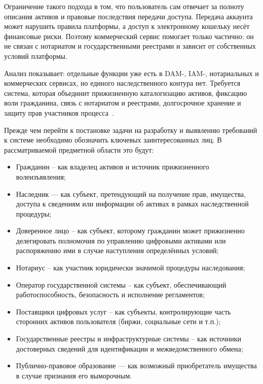 Ограничение такого подхода в том, что пользователь сам отвечает за полноту описания активов и правовые последствия передачи доступа. Передача аккаунта может нарушить правила платформы, а доступ к электронному кошельку несёт финансовые риски. Поэтому коммерческий сервис помогает только частично: он не связан с нотариатом и государственными реестрами и зависит от собственных условий платформы.

Анализ показывает: отдельные функции уже есть в DAM-, IAM-, нотариальных и коммерческих сервисах, но единого наследственного контура нет. Требуется система, которая объединит прижизненную каталогизацию активов, фиксацию воли гражданина, связь с нотариатом и реестрами, долгосрочное хранение и защиту прав участников процесса~\cite{Orlov2024Moluch, Haritonova2024HSE, Harbinja2022DigitalDeath}.

Прежде чем перейти к постановке задачи на разработку и выявлению требований к системе необходимо обозначить ключевых заинтересованных лиц. В рассматриваемой предметной области это будут:

\begin{itemize}
  \item Гражданин -- как владелец активов и источник прижизненного волеизъявления;
  \item Наследник --- как субъект, претендующий на получение прав, имущества, доступа к сведениям или информации об активах в рамках наследственной процедуры;
  \item Доверенное лицо -- как субъект, которому гражданин может прижизненно делегировать полномочия по управлению цифровыми активами или распоряжению ими в случае наступления определённых условий;
  \item Нотариус -- как участник юридически значимой процедуры наследования;
  \item Оператор государственной системы -- как субъект, обеспечивающий работоспособность, безопасность и исполнение регламентов;
  \item Поставщики цифровых услуг -- как субъекты, контролирующие часть сторонних активов пользователя (биржи, социальные сети и т.п.);
  \item Государственные реестры и инфраструктурные системы -- как источники достоверных сведений для идентификации и межведомственного обмена;
  \item Публично-правовое образование --- как возможный приобретатель имущества в случае признания его выморочным.
\end{itemize}

